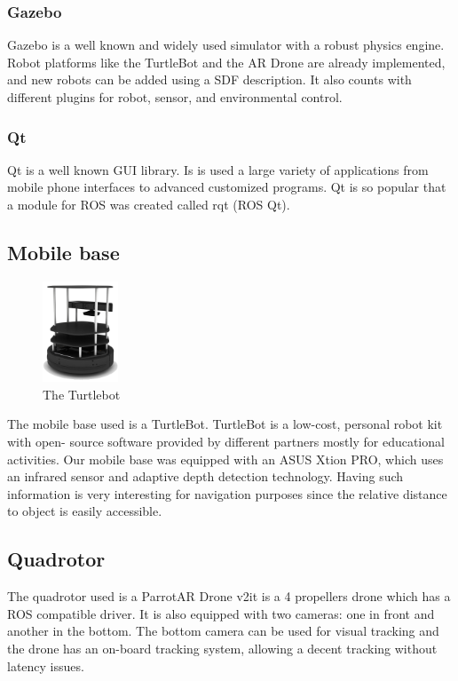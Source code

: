 \documentclass[11pt,a4paper]{article}
\begin{document}
\subsubsection{Gazebo}
Gazebo is a well known and widely used simulator with a robust physics engine. 
Robot platforms like the TurtleBot and the AR Drone are already implemented, and new robots can be added using a SDF description. It also counts with different plugins  for robot, sensor, and environmental control. 

\subsubsection{Qt}
Qt is a well known GUI library. Is is used a large variety of applications from mobile phone interfaces to advanced customized programs. Qt is so popular that a module for ROS was
created called rqt (ROS Qt).


\subsection{Mobile base}
\begin{figure}[ht]	
\centering
\includegraphics[height=3cm]{turtlebot.png}
\caption{The Turtlebot}
\end{figure}

The mobile base used is a TurtleBot. TurtleBot is a low-cost, personal robot kit with open-
source software
provided by different partners mostly for educational activities.
Our mobile base was equipped with an ASUS Xtion PRO, which uses an infrared sensor and adaptive depth detection technology. Having such information is very interesting for 
navigation
purposes since the relative distance to object is easily accessible.


\subsection{Quadrotor}

The quadrotor used is a Parrot\textcopyright AR Drone v2\texttrademark it is a 4 propellers
drone which has a ROS compatible driver. It is also equipped with two cameras: one in front
and another in the bottom. The bottom camera can be used for visual tracking and the drone
has an on-board tracking system, allowing a decent tracking without latency issues.
\end{document}

